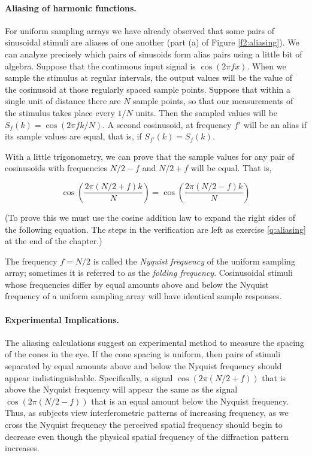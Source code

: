\paragraph{Aliasing of harmonic functions.  }
For uniform sampling arrays
we have already observed that
some pairs of sinusoidal
stimuli are aliases of one another (part (a) of Figure \ref{f2:aliasing}).
We can analyze precisely which pairs of sinusoids
form alias pairs using a little bit of algebra.
Suppose that the  continuous input signal is $\cos ( 2 \pi f x )$.
When we sample the stimulus at regular intervals, the
output values will be the value of the cosinusoid
at those regularly spaced sample points.
Suppose that within a single unit of distance there are
$N$ sample points, so that our measurements of the stimulus
takes place every $ 1 / N$ units.
Then the sampled values will be
$S_{f} ( k ) = \cos ( { 2 \pi f } { k / N } )$.
A second cosinusoid, at frequency $f'$  will be an alias
if its sample values are equal, that is,
if $S_{f'} (k) = S_{f} (k)$.

With a little trigonometry, we can prove that the
sample values for any pair of cosinusoids with frequencies
${N / 2} - f$ and ${N / 2} + f $ will be equal.
That is,

\[
\cos ( \frac{2 \pi ({ N / 2 } + f )  k }{ N } ) = \cos ( \frac {2 \pi ({ N/ 2 } - f )  k }{ N }  ) 
\]

(To prove this we must use the cosine addition law to expand the
right sides of the following equation.
The steps in the verification are left as
exercise \ref{q:aliasing} at the end of the chapter.)

The frequency $f = N / 2 $ is called the {\em Nyquist frequency}
of the uniform sampling array;
sometimes it is referred to as the {\em folding frequency}.
Cosinusoidal stimuli whose
frequencies differ by equal amounts above and below
the Nyquist frequency of a uniform sampling
array will have identical sample responses.

\paragraph{Experimental Implications.}
The aliasing calculations suggest an experimental method to
measure the spacing of the cones in the eye.
If the cone spacing is uniform,
then pairs of stimuli separated by equal amounts
above and below the Nyquist frequency
should appear indistinguishable.
Specifically, a signal $\cos (2 \pi ( { N / 2} + f ) )$ that is
above the Nyquist frequency
will appear the same as the signal
$\cos ( 2 \pi ( { N / 2 } - f) )$ that is an equal
amount below the Nyquist frequency.
Thus, as subjects view interferometric patterns
of increasing frequency, as we cross the Nyquist
frequency the perceived spatial frequency should
begin to decrease even though the
physical spatial frequency of the diffraction pattern increases.

